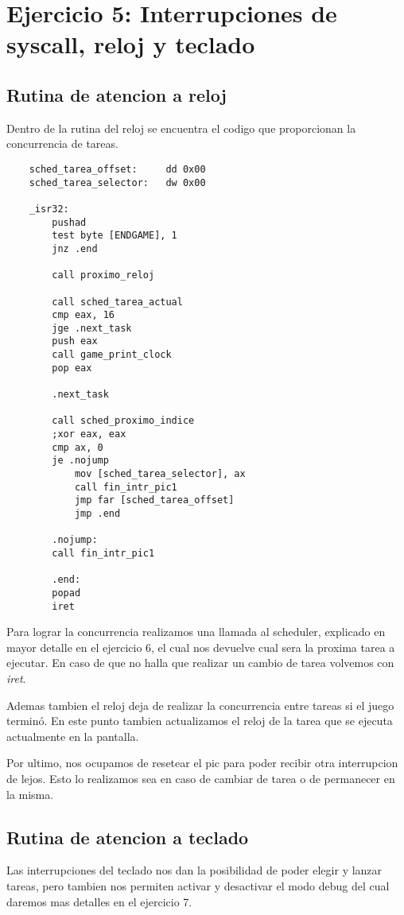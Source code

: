 \section{Ejercicio 5: Interrupciones de syscall, reloj y teclado}

	\subsection{Rutina de atencion a reloj}
	Dentro de la rutina del reloj se encuentra el codigo que proporcionan la concurrencia de tareas.

	\begin{lstlisting}
	sched_tarea_offset:     dd 0x00
	sched_tarea_selector:   dw 0x00

	_isr32:
	    pushad
	    test byte [ENDGAME], 1
	    jnz .end

    	call proximo_reloj

	    call sched_tarea_actual
	    cmp eax, 16 
	    jge .next_task
	    push eax
	    call game_print_clock
	    pop eax

	    .next_task

	    call sched_proximo_indice 
	    ;xor eax, eax
	    cmp ax, 0
	    je .nojump
	        mov [sched_tarea_selector], ax
	        call fin_intr_pic1
	        jmp far [sched_tarea_offset]
	        jmp .end

	    .nojump:
	    call fin_intr_pic1

	    .end:
	    popad
	    iret
	\end{lstlisting}

	Para lograr la concurrencia realizamos una llamada al scheduler, explicado en mayor detalle en el ejercicio 6, el cual nos devuelve cual sera la proxima tarea a ejecutar. En caso de que no halla que realizar un cambio de tarea volvemos con \textit{iret}. 

	Ademas tambien el reloj deja de realizar la concurrencia entre tareas si el juego terminó. En este punto tambien actualizamos el reloj de la tarea que se ejecuta actualmente en la pantalla. 

	Por ultimo, nos ocupamos de resetear el pic para poder recibir otra interrupcion de lejos. Esto lo realizamos sea en caso de cambiar de tarea o de permanecer en la misma.

	\subsection{Rutina de atencion a teclado}
	Las interrupciones del teclado nos dan la posibilidad de poder elegir y lanzar tareas, pero tambien nos permiten activar y desactivar el modo debug del cual daremos mas detalles en el ejercicio 7.

